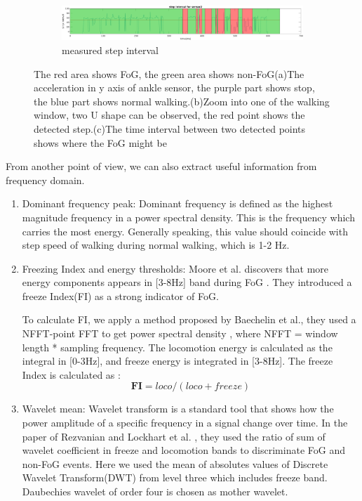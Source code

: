\documentclass[article]{article}
\begin{document}
\begin{figure}
	
	\begin{subfigure}[b]{1\textwidth}
		\centering
		\includegraphics[width=\textwidth]{step_interval_fast_s2_p2}
		\caption{measured step interval}
		\label{interval}
	\end{subfigure}
	
	
	
	\caption{The red area shows FoG, the green area shows non-FoG(a)The acceleration in y axis of ankle sensor, the purple part shows stop, the blue part shows normal walking.(b)Zoom into one of the walking window, two U shape can be observed, the red point shows the detected step.(c)The time interval between two detected points shows where the FoG might be}
	\label{fig:three graphs}
\end{figure}

	From another point of view, we can also extract useful information from frequency domain.

	\begin{enumerate}
		\item Dominant frequency peak: Dominant frequency is defined as the highest magnitude frequency in a power spectral density. This is the frequency which carries the most energy. Generally speaking, this value should coincide with step speed of walking during normal walking, which is 1-2 Hz. 
	
		\item Freezing Index and energy thresholds: Moore et al. discovers that more energy components appears
			in [3-8Hz] band during FoG \cite{FI}. They introduced a freeze Index(FI) as a strong indicator of FoG.
			
			To calculate FI, we apply a method proposed by Baechelin et al., they used a NFFT-point FFT to get power spectral density \cite{FI1}, where NFFT = window length * sampling frequency. The locomotion energy is calculated as the integral in [0-3Hz], and freeze energy is integrated in [3-8Hz]. The freeze Index is calculated as :
			\begin{equation}
			\mathbf{FI} = loco/(loco+freeze)
			\end{equation}			


	
		\item Wavelet mean: Wavelet transform is a standard tool that shows how the power amplitude of a specific frequency in a signal change over time. In the paper of Rezvanian and Lockhart et al. \cite{WM}, they used the ratio of sum of wavelet coefficient in freeze and locomotion bands to discriminate FoG and non-FoG events. Here we used the mean of absolutes values of Discrete Wavelet Transform(DWT) from level three which includes freeze band. Daubechies wavelet of order four is chosen as mother wavelet. 
	
	\end{enumerate}
\end{document}
